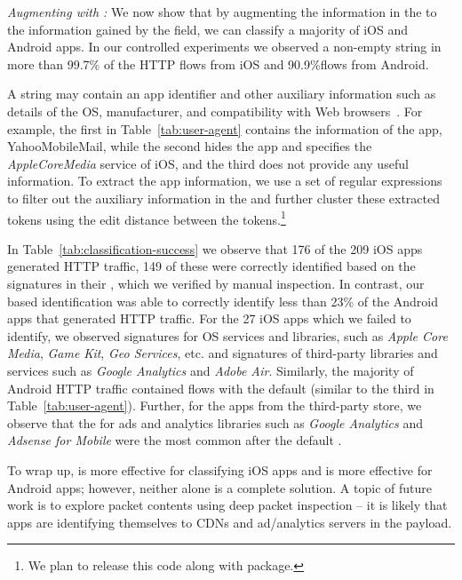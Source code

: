 \emph{Augmenting with \useragent: } We now show that by augmenting the information in the \useragent to the information gained by the \httphost field, we can classify a majority of iOS and Android apps. 
In our controlled experiments we observed a non-empty \useragent string in more than 99.7\% of the HTTP flows from iOS and 90.9\%flows from Android. 

A \useragent string may contain an app identifier and other auxiliary information such as details of the OS, manufacturer, and compatibility with Web browsers~\cite{mozilla:useragentdetection}. 
For example, the first \useragent in Table~\ref{tab:user-agent} contains the information of the app, YahooMobileMail, while the second \useragent hides the app and specifies the \emph{AppleCoreMedia} service of iOS, and the third does not provide any useful information. 
To extract the app information, we use a set of regular expressions to filter out the auxiliary information in the \useragent and further cluster these extracted tokens using the edit distance between the tokens.\footnote{We plan to release this code along with \platname package.}

In Table~\ref{tab:classification-success} we observe that 176 of the 209 iOS apps generated HTTP traffic, 149 of these were correctly identified based on the signatures in their \useragent, which we verified by manual inspection.
In contrast, our \useragent based identification was able to correctly identify less than 23\% of the Android apps that generated HTTP traffic. 
For the 27 iOS apps which we failed to identify, we observed signatures for OS services and libraries, such as \emph{Apple Core Media}, \emph{Game Kit}, \emph{Geo Services}, etc. and signatures of third-party libraries and services such as \emph{Google Analytics} and \emph{Adobe Air}.
Similarly, the majority of Android HTTP traffic contained flows with the default \useragent (similar to the third \useragent in Table~\ref{tab:user-agent}).
Further, for the apps from the third-party store, we observe that the \useragent for ads and analytics libraries such as \emph{Google Analytics} and \emph{Adsense for Mobile} were the most common \useragent after the default \useragent.

To wrap up, \useragent is more effective for classifying iOS apps and \httphost is more effective for Android apps; however, neither alone is a complete 
solution. A topic of future work is to explore packet contents using deep packet inspection -- it is likely that apps are identifying themselves to CDNs and 
ad/analytics servers in the payload. 

